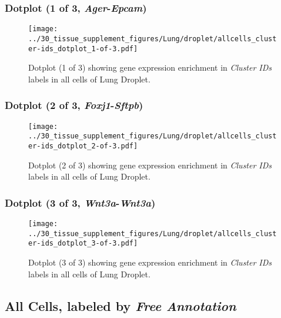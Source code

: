 \clearpage

\subsubsection{Dotplot (1 of 3, \emph{Ager}-\emph{Epcam})}
\begin{figure}[h]
\centering
\texttt{[image: ../30\_tissue\_supplement\_figures/Lung/droplet/allcells\_cluster-ids\_dotplot\_1-of-3.pdf]}

\caption{ Dotplot (1 of 3)  showing gene expression enrichment in \emph{Cluster IDs} labels in all cells of Lung Droplet. }
\end{figure}


\clearpage

\subsubsection{Dotplot (2 of 3, \emph{Foxj1}-\emph{Sftpb})}
\begin{figure}[h]
\centering
\texttt{[image: ../30\_tissue\_supplement\_figures/Lung/droplet/allcells\_cluster-ids\_dotplot\_2-of-3.pdf]}

\caption{ Dotplot (2 of 3)  showing gene expression enrichment in \emph{Cluster IDs} labels in all cells of Lung Droplet. }
\end{figure}


\clearpage

\subsubsection{Dotplot (3 of 3, \emph{Wnt3a}-\emph{Wnt3a})}
\begin{figure}[h]
\centering
\texttt{[image: ../30\_tissue\_supplement\_figures/Lung/droplet/allcells\_cluster-ids\_dotplot\_3-of-3.pdf]}

\caption{ Dotplot (3 of 3)  showing gene expression enrichment in \emph{Cluster IDs} labels in all cells of Lung Droplet. }
\end{figure}


\clearpage

\subsection{All Cells, labeled by \emph{Free Annotation}}
